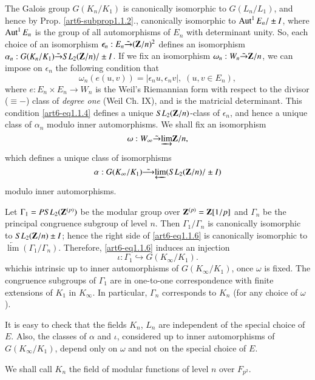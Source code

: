 \begin{definitions*}
The Galois group $G(K_n/ K_1)$ is canonically isomorphic to $G(L_n / L_1)$, and hence by Prop. \ref{art6-subprop1.1.2}., canonically isomorphic to $\operatorname{Aut}^1 E_n/\pm I$, where $\operatorname{Aut}^1 E_n$ is the group of all automorphisms of $E_n$ with determinant unity. So, each choice of an isomorphism $\epsilon_n : E_n \tilde{\to} (\mathbf{Z}/n)^2$  defines an isomorphism $\alpha_n : G (K_n / K_1) \tilde{\to} S L_2 (\mathbf{Z}/n) / \pm I$. If we fix an isomorphism $\omega_n : W_n \tilde{\to} \mathbf{Z}/n$, we can impose on $\epsilon_n$ the following condition that 
\begin{equation}
\omega_n (e(u,v)) = |\epsilon_n u, \epsilon_n v|, \; (u, v \in E_n),
\label{art6-eq1.1.4}
\end{equation}
where $e : E_n \times E_n \to W_n$ is the Weil's Riemannian form with respect to the divisor ($\equiv -$) class of \textit{degree one} (Weil \cite{art6-key19} Ch. IX), and is the matricial  determinant. This condition \eqref{art6-eq1.1.4} defines a unique $SL_2 (\mathbf{Z}/n)$-class of $\epsilon_n$, and hence a unique class of $\alpha_n$ modulo inner automorphisms. We shall fix an isomorphism
\begin{equation}
\omega : W_\infty\tilde{\to} \underrightarrow{\lim} \mathbf{Z} / n, \label{art6-eq1.1.5}
\end{equation}
which defines a unique class of isomorphisms
\begin{equation}
\alpha : G (K_\infty / K_1) \tilde{\longrightarrow} \underleftarrow{\lim} (SL_2 (\mathbf{Z}/ n) / \pm I)
\label{art6-eq1.1.6}
\end{equation}
modulo inner automorphisms.

Let $\Gamma_1 = PSL_2 (\mathbf{Z}^{(p)})$ be the modular group over $\mathbf{Z}^{(p)} = \mathbf{Z}[1/p]$ and $\Gamma_n$ be the principal congruence subgroup of level $n$. Then $\Gamma_1/ \Gamma_n$ is canonically isomorphic to $SL_2 (\mathbf{Z}/n) \pm I$; hence the right side of \eqref{art6-eq1.1.6} is canonically isomorphic to $\underleftarrow{\lim} (\Gamma_1/\Gamma_n)$. Therefore, \eqref{art6-eq1.1.6} induces an injection
\begin{equation}
\iota : \Gamma_1 \hookrightarrow G (K_\infty / K_1).  \label{art6-eq1.1.7}
\end{equation}
which\pageoriginale is intrinsic up to inner automorphisms of $G(K_\infty/ K_1)$, once $\omega$ is fixed. The congruence subgroups of $\Gamma_1$ are in one-to-one correspondence with finite extensions of $K_1$ in $K_\infty$. In particular, $\Gamma_n$ corresponds to $K_n$ (for any choice of $\omega$).

It is easy to check that the fields $K_n$, $L_n$ are independent of the special choice of $E$. Also, the classes of $\alpha$ and $\iota$, considered up to inner automorphisms of $G(K_\infty/ K_1)$, depend only on $\omega$ and not on the special choice of $E$.

We shall call $K_n$ the field of modular functions of level $n$ over $F_{p^2}$.
\end{definitions*}

